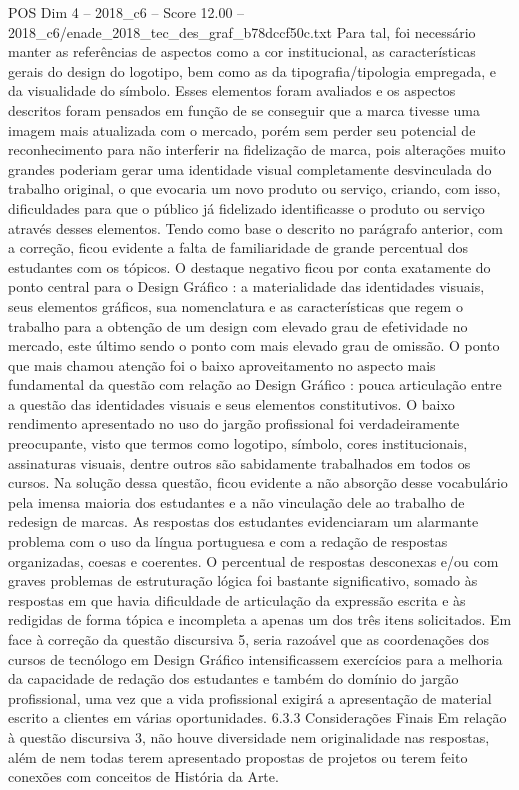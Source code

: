 \begin{textsample}{POS Dim 4 – 2018\_c6 – Score 12.00 – 2018\_c6/enade\_2018\_tec\_des\_graf\_b78dccf50c.txt}
Para tal, foi necessário manter as referências de aspectos como a cor institucional, as características gerais do design do logotipo, bem como as da tipografia/tipologia empregada, e da visualidade do símbolo.
Esses elementos foram avaliados e os aspectos descritos foram pensados em função de se conseguir que a marca tivesse uma imagem mais atualizada com o mercado, porém sem perder seu potencial de reconhecimento para não interferir na fidelização de marca, pois alterações muito grandes poderiam gerar uma identidade visual completamente desvinculada do trabalho original, o que evocaria um novo produto ou serviço, criando, com isso, dificuldades para que o público já fidelizado identificasse o produto ou serviço através desses elementos.
Tendo como base o descrito no parágrafo anterior, com a correção, ficou evidente a falta de familiaridade de grande percentual dos estudantes com os tópicos.
O destaque negativo ficou por conta exatamente do ponto central para o Design Gráfico : a materialidade das identidades visuais, seus elementos gráficos, sua nomenclatura e as características que regem o trabalho para a obtenção de um design com elevado grau de efetividade no mercado, este último sendo o ponto com mais elevado grau de omissão.
O ponto que mais chamou atenção foi o baixo aproveitamento no aspecto mais fundamental da questão com relação ao Design Gráfico : pouca articulação entre a questão das identidades visuais e seus elementos constitutivos.
O baixo rendimento apresentado no uso do jargão profissional foi verdadeiramente preocupante, visto que termos como logotipo, símbolo, cores institucionais, assinaturas visuais, dentre outros são sabidamente trabalhados em todos os cursos.
Na solução dessa questão, ficou evidente a não absorção desse vocabulário pela imensa maioria dos estudantes e a não vinculação dele ao trabalho de redesign de marcas.
As respostas dos estudantes evidenciaram um alarmante problema com o uso da língua portuguesa e com a redação de respostas organizadas, coesas e coerentes.
O percentual de respostas desconexas e/ou com graves problemas de estruturação lógica foi bastante significativo, somado às respostas em que havia dificuldade de articulação da expressão escrita e às redigidas de forma tópica e incompleta a apenas um dos três itens solicitados.
Em face à correção da questão discursiva 5, seria razoável que as coordenações dos cursos de tecnólogo em Design Gráfico intensificassem exercícios para a melhoria da capacidade de redação dos estudantes e também do domínio do jargão profissional, uma vez que a vida profissional exigirá a apresentação de material escrito a clientes em várias oportunidades. 6.3.3 Considerações Finais Em relação à questão discursiva 3, não houve diversidade nem originalidade nas respostas, além de nem todas terem apresentado propostas de projetos ou terem feito conexões com conceitos de História da Arte.

\end{textsample}
